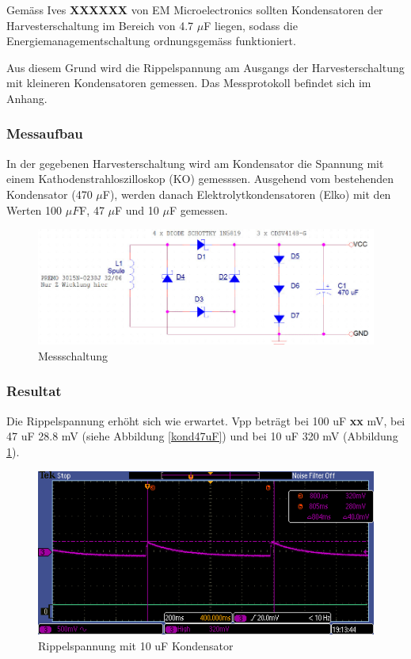 Gemäss Ives \textbf{XXXXXX} von EM Microelectronics sollten Kondensatoren der Harvesterschaltung im Bereich von 4.7 $\mu$F liegen, sodass die Energiemanagementschaltung ordnungsgemäss funktioniert.  

Aus diesem Grund wird die Rippelspannung am Ausgangs der Harvesterschaltung mit kleineren Kondensatoren gemessen. Das Messprotokoll befindet sich im Anhang.

\subsubsection*{Messaufbau}
In der gegebenen Harvesterschaltung wird am Kondensator die Spannung mit einem Kathodenstrahloszilloskop (KO) gemesssen. Ausgehend vom bestehenden Kondensator (470 $ \mu $F), werden danach Elektrolytkondensatoren (Elko) mit den Werten 100 $\mu F $F, 47 $\mu$F und 10 $\mu$F gemessen.

\begin{figure}[h]
    \includegraphics[width=15cm]{3Vorgehen/imag/messschaltungHarvesterschaltung.jpg}
    \caption{Messschaltung}
\end{figure}

\subsubsection*{Resultat}

Die Rippelspannung erhöht sich wie erwartet. Vpp beträgt bei 100 uF \textbf{xx} mV, bei 47 uF 28.8 mV (siehe Abbildung \ref{kond47uF}) und bei 10 uF 320 mV (Abbildung \ref{kond10uF}).
 
\begin{figure}
    \includegraphics[width=15cm]{3Vorgehen/imag/10uF.PNG}
    \caption{Rippelspannung mit 10 uF Kondensator}\label{kond10uF} 
\end{figure}

